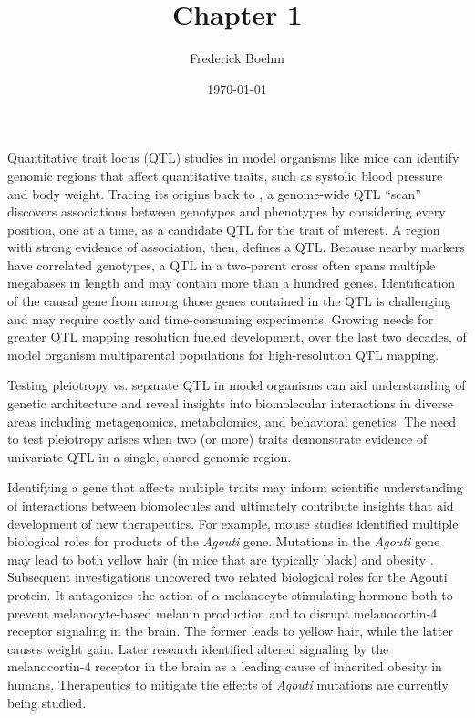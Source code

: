 \documentclass[]{article}\usepackage[]{graphicx}\usepackage[]{color}
\title{Chapter 1}
\author{Frederick Boehm}
\date{\today}
\begin{document}
\doublespacing
\maketitle

\listoftodos
\listoffigures
\listoftables



Quantitative trait locus (QTL) studies in model organisms like mice can identify 
genomic regions that affect quantitative traits, such as systolic blood pressure and body weight.
Tracing its origins back to \citet{sax1923association}, a genome-wide QTL ``scan'' discovers
associations between genotypes and phenotypes by considering every position, one at a time, as a candidate QTL for the trait of interest.
A region with strong evidence of association, then, defines a QTL. Because nearby markers have correlated
genotypes, a QTL in a two-parent cross often spans multiple megabases in length and may contain more than a hundred genes.
Identification of the causal gene from among those genes contained in the QTL is challenging and may require costly and time-consuming experiments. 
Growing needs for greater QTL mapping resolution fueled development, over the last two decades, of model organism multiparental populations for high-resolution QTL mapping.







Testing pleiotropy vs. separate QTL in model organisms can aid understanding of 
genetic architecture and reveal insights into biomolecular interactions in 
diverse areas including metagenomics, metabolomics, and behavioral genetics.
The need to test pleiotropy arises when two (or more) traits demonstrate evidence 
of univariate QTL in a single, shared genomic region. 



Identifying a gene that affects multiple traits may inform scientific understanding of
interactions between biomolecules and ultimately contribute insights that aid development
of new therapeutics. 
For example, mouse studies identified multiple biological roles for products of 
the \emph{Agouti} gene. Mutations in the \emph{Agouti} gene may lead to both 
yellow hair (in mice that are typically black) and obesity \citep{attie2017how}.
Subsequent investigations uncovered two related biological roles for the Agouti protein.
It antagonizes the action of $\alpha$-melanocyte-stimulating hormone both to
prevent melanocyte-based melanin production and to disrupt melanocortin-4 receptor signaling in the brain.
The former leads to yellow hair, while the latter causes weight gain.
Later research identified altered signaling by the melanocortin-4 receptor in the brain as a leading cause of inherited obesity in humans.
Therapeutics to mitigate the effects of \emph{Agouti} mutations are currently being studied.
\end{document}
